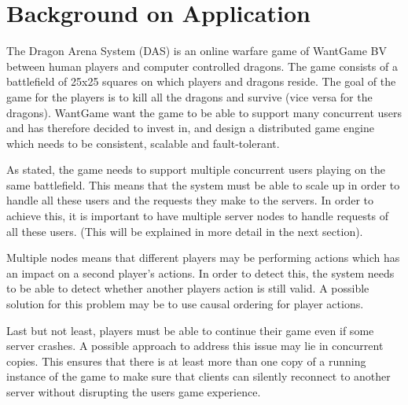 \section{Background on Application }


The Dragon Arena System (DAS) is an online warfare game of WantGame BV between human players and computer controlled dragons.
The game consists of a battlefield of 25x25 squares on which players and dragons reside.
The goal of the game for the players is to kill all the dragons and survive (vice versa for the dragons).
WantGame want the game to be able to support many concurrent users and has therefore decided to invest in, and design a distributed game engine which needs to be consistent, scalable and fault-tolerant. 

As stated, the game needs to support multiple concurrent users playing on the same battlefield. 
This means that the system must be able to scale up in order to handle all these users and the requests they make to the servers. 
In order to achieve this, it is important to have multiple server nodes to handle requests of all these users. 
(This will be explained in more detail in the next section).

Multiple nodes means that different players may be performing actions which has an impact on a second player's actions.
In order to detect this, the system needs to be able to detect whether another players action is still valid. 
A possible solution for this problem may be to use causal ordering for player actions. %

Last but not least, players must be able to continue their game even if some server crashes. 
A possible approach to address this issue may lie in concurrent copies. %
This ensures that there is at least more than one copy of a running instance of the game to make sure that clients can silently reconnect to another server without disrupting the users game experience. 
